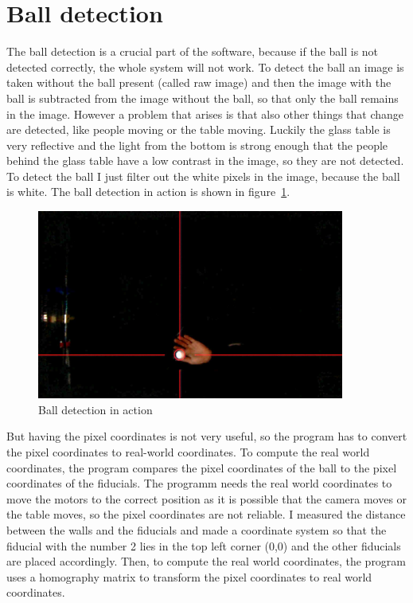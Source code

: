 \section{Ball detection}\label{sec:ball-detection}
The ball detection is a crucial part of the software, because if the ball is not detected correctly, the whole system will not work.
To detect the ball an image is taken without the ball present (called raw image) and then the image with the ball is subtracted from the image without the ball, so that only the ball remains in the image.
However a problem that arises is that also other things that change are detected, like people moving or the table moving.
Luckily the glass table is very reflective and the light from the bottom is strong enough that the people behind the glass table have a low contrast in the image, so they are not detected.
To detect the ball I just filter out the white pixels in the image, because the ball is white.
The ball detection in action is shown in figure~\ref{fig:ball_detection}.
\begin{figure}[H]
    \centering
    \includegraphics[width=0.9\textwidth]{../photos/ball_detection}
    \caption[ball-detection]{Ball detection in action}
    \label{fig:ball_detection}
\end{figure}
But having the pixel coordinates is not very useful, so the program has to convert the pixel coordinates to real-world coordinates.
To compute the real world coordinates, the program compares the pixel coordinates of the ball to the pixel coordinates of the fiducials.
The programm needs the real world coordinates to move the motors to the correct position as it is possible that the camera moves or the table moves, so the pixel coordinates are not reliable.
I measured the distance between the walls and the fiducials and made a coordinate system so that the fiducial with the number 2 lies in the top left corner (0,0) and the other fiducials are placed accordingly.
Then, to compute the real world coordinates, the program uses a homography\autocite{homography} matrix to transform the pixel coordinates to real world coordinates.


